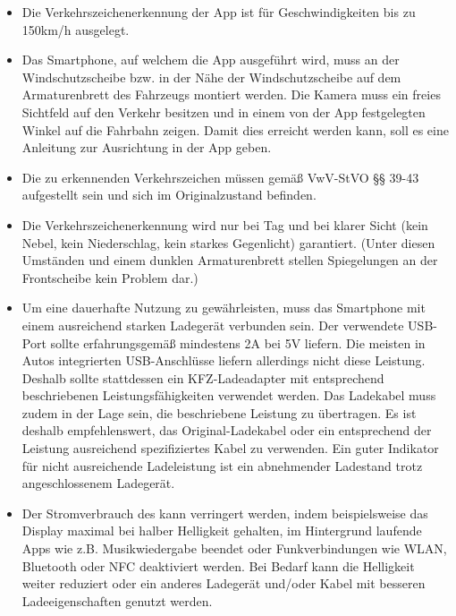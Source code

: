 \documentclass[12pt,a4paper,ngerman,enabledeprecatedfontcommands]{scrreprt}
\begin{document}
\begin{itemize}


\item Die Verkehrszeichenerkennung der \gls{App} ist für Geschwindigkeiten bis zu 150km/h ausgelegt.

\item Das \gls{Smartphone}, auf welchem die \gls{App} ausgeführt wird, muss an der Windschutzscheibe bzw. in der Nähe der Windschutzscheibe auf dem Armaturenbrett des Fahrzeugs montiert werden. Die Kamera muss ein freies Sichtfeld auf den Verkehr besitzen und in einem von der \gls{App} festgelegten Winkel auf die Fahrbahn zeigen. Damit dies erreicht werden kann, soll es eine Anleitung zur Ausrichtung in der \gls{App} geben.

\item Die zu erkennenden Verkehrszeichen müssen gemäß \gls{VwV-StVO} §§ 39-43 aufgestellt sein und sich im Originalzustand befinden.

\item Die Verkehrszeichenerkennung wird nur bei Tag und bei klarer Sicht (kein Nebel, kein Niederschlag, kein starkes Gegenlicht) garantiert. (Unter diesen Umständen und einem dunklen Armaturenbrett stellen Spiegelungen an der Frontscheibe kein Problem dar.)

\item Um eine dauerhafte Nutzung zu gewährleisten, muss das \gls{Smartphone} mit einem ausreichend starken Ladegerät verbunden sein. Der verwendete USB-Port sollte erfahrungsgemäß mindestens 2A bei 5V liefern. Die meisten in Autos integrierten USB-Anschlüsse liefern allerdings nicht diese Leistung. Deshalb sollte stattdessen ein KFZ-Ladeadapter mit entsprechend beschriebenen Leistungsfähigkeiten verwendet werden. Das Ladekabel muss zudem in der Lage sein, die beschriebene Leistung zu übertragen. Es ist deshalb empfehlenswert, das Original-Ladekabel oder ein entsprechend der Leistung ausreichend spezifiziertes Kabel zu verwenden. Ein guter Indikator für nicht ausreichende Ladeleistung ist ein abnehmender Ladestand trotz angeschlossenem Ladegerät.

\item Der Stromverbrauch des  kann verringert werden, indem beispielsweise das Display maximal bei halber Helligkeit gehalten, im Hintergrund laufende Apps wie z.B. Musikwiedergabe beendet oder Funkverbindungen wie WLAN, Bluetooth oder NFC deaktiviert werden. Bei Bedarf kann die Helligkeit weiter reduziert oder ein anderes Ladegerät und/oder Kabel mit besseren Ladeeigenschaften genutzt werden.

\end{itemize}
\end{document}
